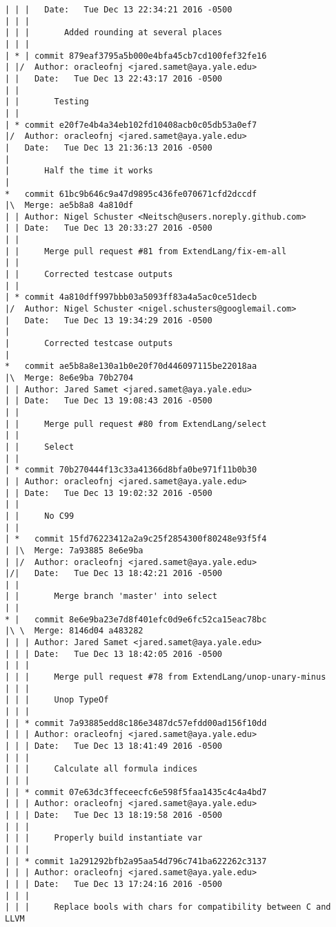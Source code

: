 \begin{lstlisting}
| | |   Date:   Tue Dec 13 22:34:21 2016 -0500
| | |   
| | |       Added rounding at several places
| | |    
| * | commit 879eaf3795a5b000e4bfa45cb7cd100fef32fe16
| |/  Author: oracleofnj <jared.samet@aya.yale.edu>
| |   Date:   Tue Dec 13 22:43:17 2016 -0500
| |   
| |       Testing
| |   
| * commit e20f7e4b4a34eb102fd10408acb0c05db53a0ef7
|/  Author: oracleofnj <jared.samet@aya.yale.edu>
|   Date:   Tue Dec 13 21:36:13 2016 -0500
|   
|       Half the time it works
|    
*   commit 61bc9b646c9a47d9895c436fe070671cfd2dccdf
|\  Merge: ae5b8a8 4a810df
| | Author: Nigel Schuster <Neitsch@users.noreply.github.com>
| | Date:   Tue Dec 13 20:33:27 2016 -0500
| | 
| |     Merge pull request #81 from ExtendLang/fix-em-all
| |     
| |     Corrected testcase outputs
| |   
| * commit 4a810dff997bbb03a5093ff83a4a5ac0ce51decb
|/  Author: Nigel Schuster <nigel.schusters@googlemail.com>
|   Date:   Tue Dec 13 19:34:29 2016 -0500
|   
|       Corrected testcase outputs
|    
*   commit ae5b8a8e130a1b0e20f70d446097115be22018aa
|\  Merge: 8e6e9ba 70b2704
| | Author: Jared Samet <jared.samet@aya.yale.edu>
| | Date:   Tue Dec 13 19:08:43 2016 -0500
| | 
| |     Merge pull request #80 from ExtendLang/select
| |     
| |     Select
| |   
| * commit 70b270444f13c33a41366d8bfa0be971f11b0b30
| | Author: oracleofnj <jared.samet@aya.yale.edu>
| | Date:   Tue Dec 13 19:02:32 2016 -0500
| | 
| |     No C99
| |     
| *   commit 15fd76223412a2a9c25f2854300f80248e93f5f4
| |\  Merge: 7a93885 8e6e9ba
| |/  Author: oracleofnj <jared.samet@aya.yale.edu>
|/|   Date:   Tue Dec 13 18:42:21 2016 -0500
| |   
| |       Merge branch 'master' into select
| |     
* |   commit 8e6e9ba23e7d8f401efc0d9e6fc52ca15eac78bc
|\ \  Merge: 8146d04 a483282
| | | Author: Jared Samet <jared.samet@aya.yale.edu>
| | | Date:   Tue Dec 13 18:42:05 2016 -0500
| | | 
| | |     Merge pull request #78 from ExtendLang/unop-unary-minus
| | |     
| | |     Unop TypeOf
| | |    
| | * commit 7a93885edd8c186e3487dc57efdd00ad156f10dd
| | | Author: oracleofnj <jared.samet@aya.yale.edu>
| | | Date:   Tue Dec 13 18:41:49 2016 -0500
| | | 
| | |     Calculate all formula indices
| | |    
| | * commit 07e63dc3ffeceecfc6e598f5faa1435c4c4a4bd7
| | | Author: oracleofnj <jared.samet@aya.yale.edu>
| | | Date:   Tue Dec 13 18:19:58 2016 -0500
| | | 
| | |     Properly build instantiate var
| | |    
| | * commit 1a291292bfb2a95aa54d796c741ba622262c3137
| | | Author: oracleofnj <jared.samet@aya.yale.edu>
| | | Date:   Tue Dec 13 17:24:16 2016 -0500
| | | 
| | |     Replace bools with chars for compatibility between C and LLVM

\end{lstlisting}
